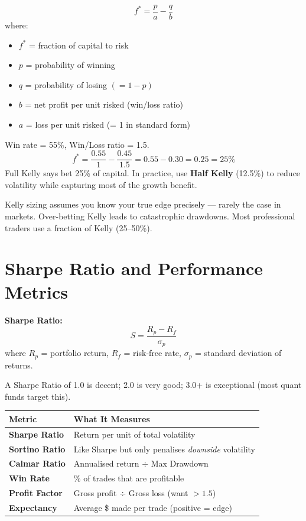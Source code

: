 \begin{formulabox}
\[
  f^* = \frac{p}{a} - \frac{q}{b}
\]
where:
\begin{itemize}[noitemsep]
  \item $f^*$ = fraction of capital to risk
  \item $p$ = probability of winning
  \item $q$ = probability of losing $(= 1 - p)$
  \item $b$ = net profit per unit risked (win/loss ratio)
  \item $a$ = loss per unit risked (= 1 in standard form)
\end{itemize}
\end{formulabox}

\begin{examplebox}
Win rate = 55\%, Win/Loss ratio = 1.5.
\[
  f^* = \frac{0.55}{1} - \frac{0.45}{1.5} = 0.55 - 0.30 = 0.25 = 25\%
\]
Full Kelly says bet 25\% of capital. In practice, use \textbf{Half Kelly} (12.5\%) to reduce
volatility while capturing most of the growth benefit.
\end{examplebox}

\begin{notebox}
Kelly sizing assumes you know your true edge precisely — rarely the case in markets.
Over-betting Kelly leads to catastrophic drawdowns. Most professional traders
use a fraction of Kelly (25--50\%).
\end{notebox}

\section{Sharpe Ratio and Performance Metrics}

\begin{formulabox}
\textbf{Sharpe Ratio:}
\[
  S = \frac{R_p - R_f}{\sigma_p}
\]
where $R_p$ = portfolio return, $R_f$ = risk-free rate, $\sigma_p$ = standard deviation of returns.
\end{formulabox}

A Sharpe Ratio of 1.0 is decent; 2.0 is very good; 3.0+ is exceptional (most quant funds target this).

\begin{center}
\begin{tabular}{>{\bfseries}p{4cm} p{8.5cm}}
\toprule
Metric & What It Measures \\
\midrule
Sharpe Ratio & Return per unit of total volatility \\
Sortino Ratio & Like Sharpe but only penalises \emph{downside} volatility \\
Calmar Ratio & Annualised return $\div$ Max Drawdown \\
Win Rate & \% of trades that are profitable \\
Profit Factor & Gross profit $\div$ Gross loss (want $>1.5$) \\
Expectancy & Average \$ made per trade (positive = edge) \\
\bottomrule
\end{tabular}
\end{center}

